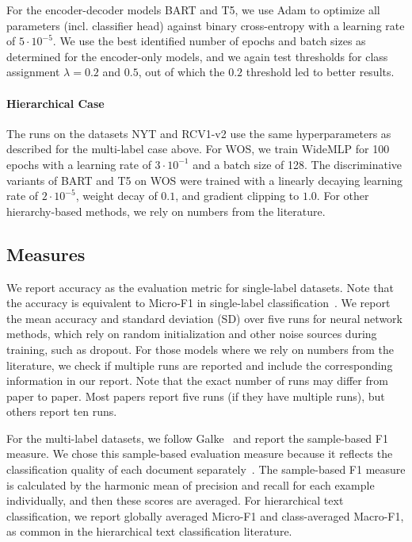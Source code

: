 \documentclass[lettersize,journal]{IEEEtran}
\begin{document}
For the encoder-decoder models BART and T5, we use Adam to optimize all parameters (incl. classifier head) against binary cross-entropy with a learning rate of $5 \cdot 10^{-5}$. We use the best identified number of epochs and batch sizes as determined for the encoder-only models, and we again test thresholds for class assignment $\lambda = 0.2$ and $0.5$, out of which the $0.2$ threshold led to better results. 

\paragraph{Hierarchical Case}
The runs on the datasets NYT and RCV1-v2 use the same hyperparameters as described for the multi-label case above. For WOS, we train WideMLP for 100 epochs with a learning rate of $3 \cdot 10^{-1}$ and a batch size of 128.
The discriminative variants of BART and T5 on WOS were trained with a linearly decaying learning rate of $2 \cdot 10^{-5}$, weight decay of $0.1$, and gradient clipping to $1.0$.
For other hierarchy-based methods, we rely on numbers from the literature.

\subsection{Measures}
We report accuracy as the evaluation metric for single-label datasets.
Note that the accuracy is equivalent to Micro-F1 in single-label classification~\cite{galkescherp-acl2022}.
We report the mean accuracy and standard deviation (SD) over five runs for neural network methods, which rely on random initialization and other noise sources during training, such as dropout. 
For those models where we rely on numbers from the literature, we check if multiple runs are reported and include the corresponding information in our report. 
Note that the exact number of runs may differ from paper to paper. Most papers report five runs (if they have multiple runs), but others report ten runs.

For the multi-label datasets, we follow Galke~\etal\cite{DBLP:conf/kcap/GalkeMSBS17} and report the sample-based F1 measure. 
We chose this sample-based evaluation measure because it reflects the classification quality of each document separately~\cite{DBLP:conf/jcdl/MaiGS18}. 
The sample-based F1 measure is calculated by the harmonic mean of precision and recall for each example individually, and then these scores are averaged.
For hierarchical text classification, we report globally averaged Micro-F1 and class-averaged Macro-F1, as common in the hierarchical text classification literature.
\end{document}
